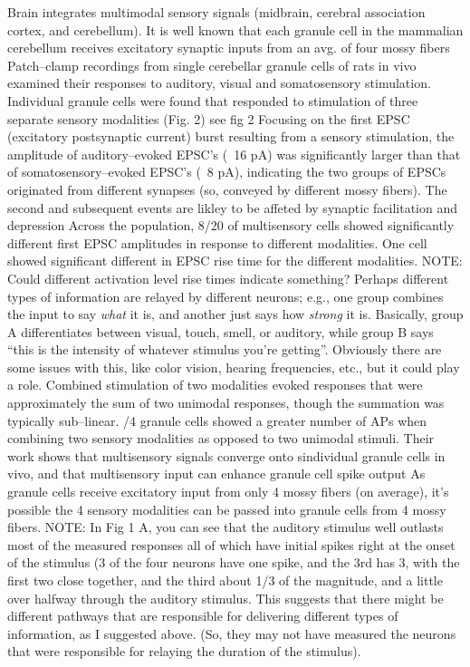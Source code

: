 \documentclass[11pt, a4paper, oneside]{article}   	%
\begin{document}
\begin{outline}
    \point Brain integrates multimodal sensory signals (midbrain, cerebral association cortex, and cerebellum). 
    \point It is well known that each granule cell in the mammalian cerebellum receives excitatory synaptic inputs from an avg. of four mossy fibers
    \point Patch--clamp recordings from single cerebellar granule cells of rats in vivo examined their responses to auditory, visual and somatosensory stimulation.
    \point Individual granule cells were found that responded to stimulation of three separate sensory modalities (Fig. 2)
        \subpoint see fig 2
    \point Focusing on the first EPSC (excitatory postsynaptic current) burst resulting from a sensory stimulation, the amplitude of auditory--evoked EPSC's (~16 pA) was significantly larger than that of somatosensory--evoked EPSC's (~8 pA), indicating the two groups of EPSCs originated from different synapses (so, conveyed by different mossy fibers). 
        \subpoint The second and subsequent events are likley to be affeted by synaptic facilitation and depression
    \point Across the population, 8/20 of multisensory cells showed significantly different first EPSC amplitudes in response to different modalities. One cell showed significant different in EPSC rise time for the different modalities.
    \subpoint NOTE: Could different activation level rise times indicate something? Perhaps different types of information are relayed by different neurons; e.g., one group combines the input to say \textit{what} it is, and another just says how \textit{strong} it is. Basically, group A differentiates between visual, touch, smell, or auditory, while group B says ``this is the intensity of whatever stimulus you're getting''. Obviously there are some issues with this, like color vision, hearing frequencies, etc., but it could play a role.
    \point Combined stimulation of two modalities evoked responses that were approximately the sum of two unimodal responses, though the summation was typically sub--linear.
    /4 granule cells showed a greater number of APs when combining two sensory modalities as opposed to two unimodal stimuli.
    \point Their work shows that multisensory signals converge onto sindividual granule cells in vivo, and that multisensory input can enhance granule cell spike output
    \point As granule cells receive excitatory input from only 4 mossy fibers (on average), it's possible the 4 sensory modalities can be passed into granule cells from 4 mossy fibers.
    \point NOTE: In Fig 1 A, you can see that the auditory stimulus well outlasts most of the measured responses all of which have initial spikes right at the onset of the stimulus (3 of the four neurons have one spike, and the 3rd has 3, with the first two close together, and the third about 1/3 of the magnitude, and a little over halfway through the auditory stimulus. This suggests that there might be different pathways that are responsible for delivering different types of information, as I suggested above. (So, they may not have measured the neurons that were responsible for relaying the duration of the stimulus).
    
\end{outline}
\end{document}
